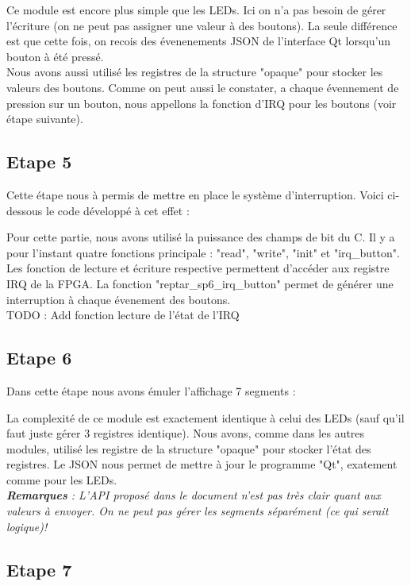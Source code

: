 Ce module est encore plus simple que les LEDs. Ici on n'a pas besoin de gérer l'écriture (on ne peut pas assigner une valeur à des boutons). La seule différence est que cette fois, on recois des évenenements JSON de l'interface Qt lorsqu'un bouton à été pressé.\\

Nous avons aussi utilisé les registres de la structure "opaque" pour stocker les valeurs des boutons. Comme on peut aussi le constater, a chaque évennement de pression sur un bouton, nous appellons la fonction d'IRQ pour les boutons (voir étape suivante).

\pagebreak
\subsection{Etape 5}
Cette étape nous à permis de mettre en place le système d'interruption. 
Voici ci-dessous le code développé à cet effet : 


\vspace{0.5cm} 

\vspace{0.5cm} 

Pour cette partie, nous avons utilisé la puissance des champs de bit du C. Il y a pour l'instant quatre fonctions principale : "read", "write", "init" et "irq\_button". Les fonction de lecture et écriture respective permettent d'accéder aux registre IRQ de la FPGA. La fonction "reptar\_sp6\_irq\_button" permet de générer une interruption à chaque évenement des boutons.  \\


TODO : Add fonction lecture de l'état de l'IRQ

\pagebreak
\subsection{Etape 6}
Dans cette étape nous avons émuler l'affichage 7 segments :

\vspace{0.5cm} 

\vspace{0.5cm} 

La complexité de ce module est exactement identique à celui des LEDs (sauf qu'il faut juste gérer 3 registres identique). Nous avons, comme dans les autres modules, utilisé les registre de la structure "opaque" pour stocker l'état des registres. Le JSON nous permet de mettre à jour le programme "Qt", exatement comme pour les LEDs.\\

\textit{\textbf{Remarques} : L'API proposé dans le document n'est pas très clair quant aux valeurs à envoyer. On ne peut pas gérer les segments séparément (ce qui serait logique)! }  

\pagebreak
\subsection{Etape 7}